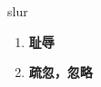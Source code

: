 
\begin{frame}
{\huge slur}
\begin{center}
\begin{enumerate}\Large
  \item \textbf{耻辱}
  \item \textbf{疏忽，忽略}
\end{enumerate}
\end{center}
\end{frame}

